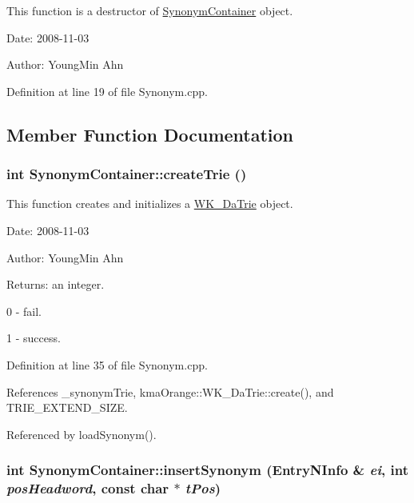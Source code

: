 This function is a destructor of \hyperlink{classkmaOrange_1_1SynonymContainer}{SynonymContainer} object. 

\begin{Desc}
\item[Date:]2008-11-03 \end{Desc}
\begin{Desc}
\item[Author:]YoungMin Ahn \end{Desc}


Definition at line 19 of file Synonym.cpp.

\subsection{Member Function Documentation}
\hypertarget{classkmaOrange_1_1SynonymContainer_2e4ae84b14cf54be1dca1af4525e0781}{
\subsubsection[{createTrie}]{\setlength{\rightskip}{0pt plus 5cm}int SynonymContainer::createTrie ()}}
\label{classkmaOrange_1_1SynonymContainer_2e4ae84b14cf54be1dca1af4525e0781}


This function creates and initializes a \hyperlink{classkmaOrange_1_1WK__DaTrie}{WK\_\-DaTrie} object. 

\begin{Desc}
\item[Date:]2008-11-03 \end{Desc}
\begin{Desc}
\item[Author:]YoungMin Ahn \end{Desc}
\begin{Desc}
\item[Returns:]an integer.\par
 0 - fail.\par
 1 - success. \end{Desc}


Definition at line 35 of file Synonym.cpp.

References \_\-synonymTrie, kmaOrange::WK\_\-DaTrie::create(), and TRIE\_\-EXTEND\_\-SIZE.

Referenced by loadSynonym().\hypertarget{classkmaOrange_1_1SynonymContainer_3f4902b3981d89207b1be2298b10fd7d}{
\subsubsection[{insertSynonym}]{\setlength{\rightskip}{0pt plus 5cm}int SynonymContainer::insertSynonym ({\bf EntryNInfo} \& {\em ei}, \/  int {\em posHeadword}, \/  const char $\ast$ {\em tPos})}}
\label{classkmaOrange_1_1SynonymContainer_3f4902b3981d89207b1be2298b10fd7d}


